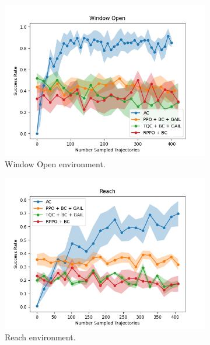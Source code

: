 \begin{figure}[htbp]
    \centering
    \begin{subfigure}[b]{0.45\textwidth}
      \includegraphics[width=\textwidth]{images/4_400/Window Open.png}
      \caption{Window Open environment.}
      \label{fig:plot1}
    \end{subfigure}
    \hfill
    \begin{subfigure}[b]{0.45\textwidth}
      \includegraphics[width=\textwidth]{images/4_400/Reach.png}
      \caption{Reach environment.}
      \label{fig:plot2}
    \end{subfigure}
    \medskip
    \begin{subfigure}[b]{0.45\textwidth}

\end{subfigure}
\end{figure}
